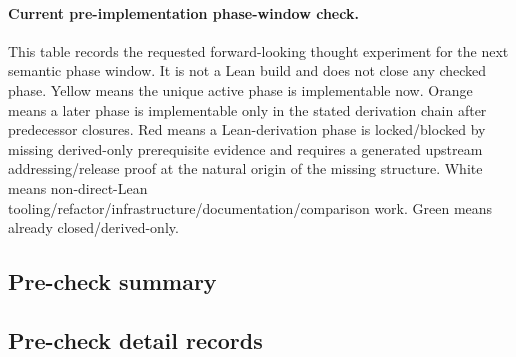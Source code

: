 \paragraph{Current pre-implementation phase-window check.} This table records the requested forward-looking thought experiment for the next semantic phase window. It is not a Lean build and does not close any checked phase. Yellow means the unique active phase is implementable now. Orange means a later phase is implementable only in the stated derivation chain after predecessor closures. Red means a Lean-derivation phase is locked/blocked by missing derived-only prerequisite evidence and requires a generated upstream addressing/release proof at the natural origin of the missing structure. White means non-direct-Lean tooling/refactor/infrastructure/documentation/comparison work. Green means already closed/derived-only.
\subsection*{Pre-check summary}

\subsection*{Pre-check detail records}


